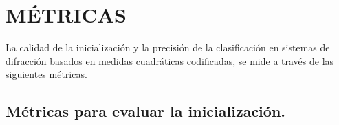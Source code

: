 \begin{table}[!h]
\caption{Resumen de la división de los conjuntos de datos usados para evaluar el método propuesto.}
\centering{}
\label{tab:conjunto_datos}
\end{table}

\section{MÉTRICAS}
La calidad de la inicialización y la precisión de la clasificación en sistemas de difracción basados en medidas cuadráticas codificadas, se mide a través de las siguientes métricas.
\subsection{Métricas para evaluar la inicialización.}

